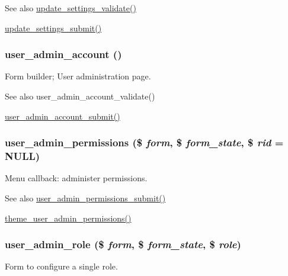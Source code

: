 \begin{DoxySeeAlso}{See also}
\hyperlink{update_8settings_8inc_a1dc52dbb9606fca692a9fb3f8127da01}{update\_\-settings\_\-validate()} 

\hyperlink{update_8settings_8inc_aeed026cbe23eddff17c100d629c4e3bc}{update\_\-settings\_\-submit()} 
\end{DoxySeeAlso}
\hypertarget{group__forms_ga3dde5a35fbda589c3fb9a4bb6d4b1d9a}{
\subsubsection[{user\_\-admin\_\-account}]{\setlength{\rightskip}{0pt plus 5cm}user\_\-admin\_\-account ()}}
\label{group__forms_ga3dde5a35fbda589c3fb9a4bb6d4b1d9a}
Form builder; User administration page.

\begin{DoxySeeAlso}{See also}
user\_\-admin\_\-account\_\-validate() 

\hyperlink{user_8admin_8inc_a20540c356ad435d034ff0229323f33d5}{user\_\-admin\_\-account\_\-submit()} 
\end{DoxySeeAlso}
\hypertarget{group__forms_gabcf8ce0bd54bdce14e7abeea7ed2bad9}{
\subsubsection[{user\_\-admin\_\-permissions}]{\setlength{\rightskip}{0pt plus 5cm}user\_\-admin\_\-permissions (\$ {\em form}, \/  \$ {\em form\_\-state}, \/  \$ {\em rid} = {\ttfamily NULL})}}
\label{group__forms_gabcf8ce0bd54bdce14e7abeea7ed2bad9}
Menu callback: administer permissions.

\begin{DoxySeeAlso}{See also}
\hyperlink{user_8admin_8inc_a05efed62d2fe9e10ee50a21b54f6ec31}{user\_\-admin\_\-permissions\_\-submit()} 

\hyperlink{group__themeable_gad8be4d71043b96d113f321c62f457765}{theme\_\-user\_\-admin\_\-permissions()} 
\end{DoxySeeAlso}
\hypertarget{group__forms_ga1b97a1d994a0fff5e514d8c0b79b9d9f}{
\subsubsection[{user\_\-admin\_\-role}]{\setlength{\rightskip}{0pt plus 5cm}user\_\-admin\_\-role (\$ {\em form}, \/  \$ {\em form\_\-state}, \/  \$ {\em role})}}
\label{group__forms_ga1b97a1d994a0fff5e514d8c0b79b9d9f}
Form to configure a single role.

